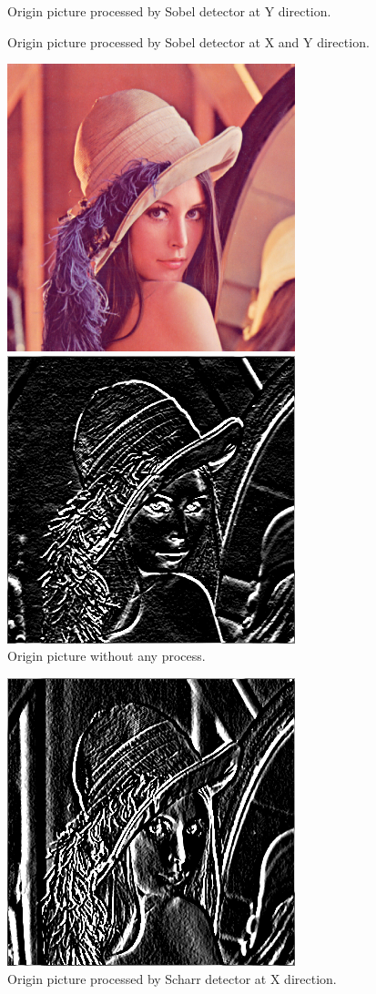 \documentclass[10pt,twocolumn,letterpaper]{article}
\begin{document}
\begin{figure}[htp]
\begin{center}
		\caption{Origin picture processed by Sobel detector at Y direction. }
		\caption{Origin picture processed by Sobel detector at X and Y direction. }
		\label{fig:long}
	\end{center}
\end{figure}

\begin{figure}[htp]
	\begin{center}
		\includegraphics[width=.473\linewidth]{../../code/Lenna.jpg} \quad
		\includegraphics[width=.473\linewidth]{../../code/lenaScharrX.png} \\ 
		\caption{Origin picture without any process. }
		\caption{Origin picture processed by Scharr detector at X direction. }
		\includegraphics[width=.473\linewidth]{../../code/lenaScharrY.png} \quad

\end{center}
\end{figure}
\end{document}

